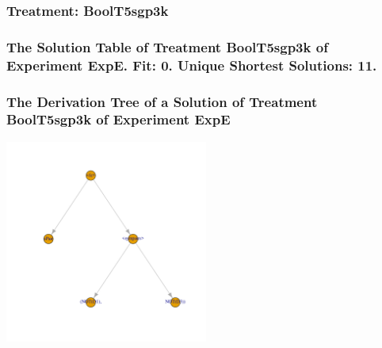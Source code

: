 \documentclass[18pt,c]{beamer}
\begin{document}
 \begin{frame}
 \fontsize{8pt}{9pt}\selectfont
 \frametitle{ Treatment: BoolT5sgp3k }

 \label{ExpEStatsTable009.tex}  
 \end{frame}

 \begin{frame}
 \fontsize{8pt}{9pt}\selectfont
 \frametitle{ The Solution Table of Treatment BoolT5sgp3k of Experiment ExpE. Fit: 0. Unique Shortest Solutions: 11. }

 \label{ExpESolutionTable006.tex}  
 \end{frame}

 \begin{frame}
 \frametitle{ The Derivation Tree of a Solution of Treatment BoolT5sgp3k of Experiment ExpE }
 \begin{center}
\includegraphics[width=0.5\textwidth, angle=0]
{ExpEDerivationTreeFigure006.pdf}
 \end{center}
 \label{report/ExpEDerivationTreeFigure006.pdf}  
 \end{frame}
\end{document}
